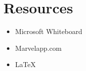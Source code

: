 \documentclass{report}
\begin{document}


\appendix
\chapter{Resources}

\begin{itemize}
    \item Microsoft Whiteboard
    \item Marvelapp.com
    \item \LaTeX
\end{itemize}
\end{document}
